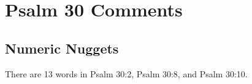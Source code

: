 \section{Psalm 30 Comments}

\subsection{Numeric Nuggets}
There are 13 words in Psalm 30:2, Psalm 30:8, and Psalm 30:10.